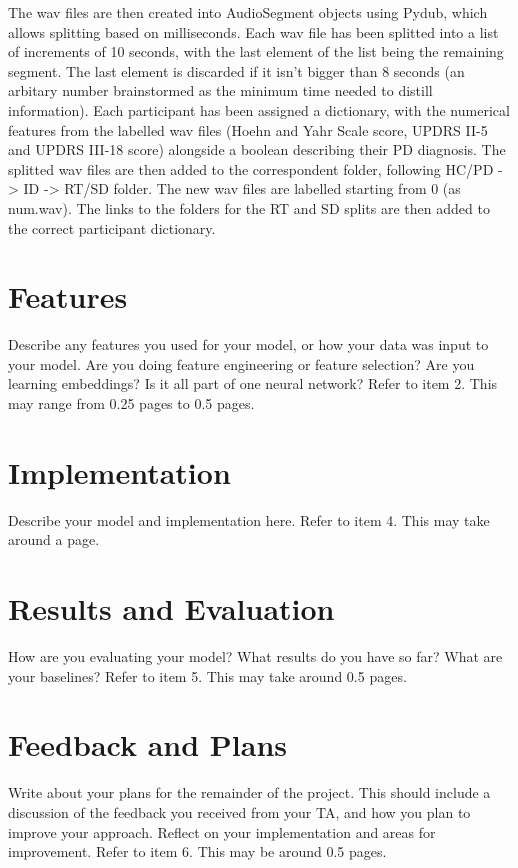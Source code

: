 \documentclass[11pt]{article}
\begin{document}
The wav files are then created into AudioSegment objects using Pydub, which allows splitting based on milliseconds. Each
wav file has been splitted into a list of increments of 10 seconds, with the last element of the list being the remaining
segment. The last element is discarded if it isn't bigger than 8 seconds (an arbitary number brainstormed as the minimum
time needed to distill information). Each participant has been assigned a dictionary, with the numerical features from the 
labelled wav files (Hoehn and Yahr Scale score, UPDRS II-5 and UPDRS III-18 score) alongside a boolean describing their
PD diagnosis. The splitted wav files are then added to the correspondent folder, following HC/PD -> ID -> RT/SD folder. The
new wav files are labelled starting from 0 (as num.wav). The links to the folders for the RT and SD splits are then
added to the correct participant dictionary. 



\section{Features}

Describe any features you used for your model, or how your data was input to your model. Are you doing feature engineering or feature selection? Are you learning embeddings? Is it all part of one neural network? Refer to item 2. This may range from 0.25 pages to 0.5 pages.

\section{Implementation}

Describe your model and implementation here. Refer to item 4. This may take around a page.

\section{Results and Evaluation}

How are you evaluating your model? What results do you have so far? What are your baselines? Refer to item 5. This may take around 0.5 pages.

\section{Feedback and Plans}

Write about your plans for the remainder of the project. This should include a discussion of the feedback you received from your TA, and how you plan to improve your approach. Reflect on your implementation and areas for improvement. Refer to item 6. This may be around 0.5 pages.
\end{document}
